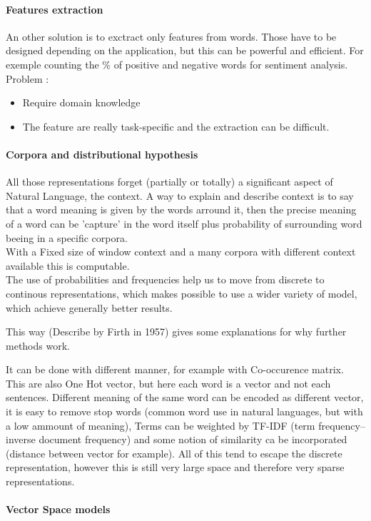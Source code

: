 		\paragraph{Features extraction}
			An other solution is to exctract only features from words. Those have to be designed depending on the application, but this can be powerful and efficient. For exemple counting the \% of positive and negative words for sentiment analysis. 
			Problem : 
			\begin{itemize}
				\item Require domain knowledge
				\item The feature are really task-specific and the extraction can be difficult.
			\end{itemize}
		\paragraph{Corpora and distributional hypothesis}
			All those representations forget (partially or totally) a significant aspect of Natural Language, the context. A way to explain and describe context is to say that a word meaning is given by the words arround it, then the precise meaning of a word can be 'capture' in the word itself plus probability of surrounding word beeing in a specific corpora. \\
			With a Fixed size of window context and a many corpora with different context available this is computable. \\
			The use of probabilities and frequencies help us to move from discrete to continous representations, which makes possible to use a wider variety of model, which achieve generally better results. 

			This way (Describe by Firth in 1957) gives some explanations for why further methods work.

			It can be done with different manner, for example with Co-occurence matrix. This are also One Hot vector, but here each word is a vector and not each sentences. Different meaning of the same word can be encoded as different vector, it is easy to remove stop words (common word use in natural languages, but with a low ammount of meaning), Terms can be weighted by TF-IDF (term frequency–inverse document frequency) and some notion of similarity ca be incorporated (distance between vector for example). All of this tend to escape the discrete representation, however this is still very large space and therefore very sparse representations.
		\paragraph*{Vector Space models}

